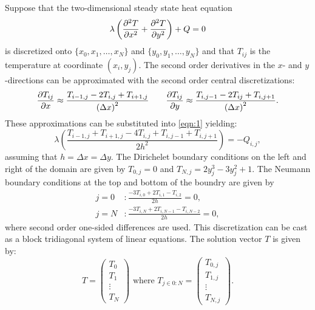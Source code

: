 \documentclass[reqno, 12pt]{amsart}
\begin{document}
    \noindent Suppose that the two-dimensional steady state heat equation
    \begin{equation}
        \lambda\left(\pdifftwo[T]{x} + \pdifftwo[T]{y}\right) + Q = 0 \label{eqn:1}
    \end{equation}
    is discretized onto $\{x_0, x_1, \dots, x_N\}$ and $\{y_0, y_1, \dots, y_N\}$ and that $T_{ij}$ is the temperature at coordinate $(x_i, y_j)$.
    The second order derivatives in the $x$- and $y$-directions can be approximated with the second order central discretizations:
    \begin{equation*}
        \pdiff[T_{ij}]{x} \approx \frac{T_{i-1,j} - 2 T_{i,j} + T_{i + 1,j}}{\left(\Delta x\right)^2}
        \qquad
        \pdiff[T_{ij}]{y} \approx \frac{T_{i, j-1} - 2T_{ij} + T_{i, j + 1}}{\left(\Delta x\right)^2}.
    \end{equation*}
    These approximations can be substituted into \cref{eqn:1} yielding:
    \begin{equation*}
        \lambda\left(\frac{T_{i-1,j} + T_{i + 1,j} - 4T_{i,j} + T_{i,j-1} + T_{i,j + 1}}{2h^2}\right) = -Q_{i,j},
    \end{equation*}
    assuming that $h = \Delta x = \Delta y$.
    The Dirichelet boundary conditions on the left and right of the domain are given by $T_{0,j} = 0$ and $T_{N,j} = 2y_j^3 - 3y_j^2 + 1$.
    The Neumann boundary conditions at the top and bottom of the boundry are given by
    \begin{align*}
        j = 0&: \frac{-3T_{i,0} + 2T_{i,1} - T_{i,2}}{2h}= 0, \\
        j = N&: \frac{-3T_{i,N} + 2T_{i,N-1} - T_{i,N-2}}{2h} = 0,
    \end{align*}
    where second order one-sided differences are used.
    This discretization can be cast as a block tridiagonal system of linear equations.
    The solution vector $T$ is given by:
    \begin{equation*}
        T = \begin{pmatrix} T_0 \\ T_1 \\ \vdots \\ T_N \end{pmatrix}
        \text{ where }
        T_{j\in 0:N} = \begin{pmatrix} T_{0,j} \\ T_{1,j} \\ \vdots \\ T_{N,j} \end{pmatrix}.
    \end{equation*}
\end{document}
